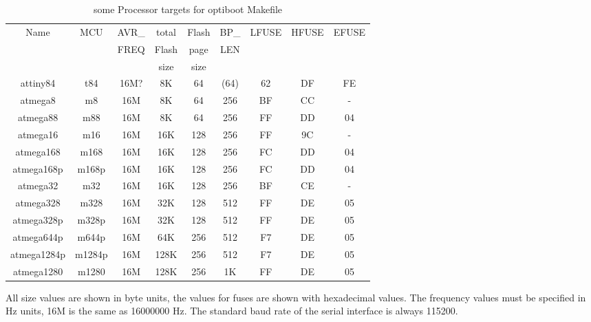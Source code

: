\begin{table}[H]
  \begin{center}
    \begin{tabular}{| c | c | c | c | c | c | c | c | c |}
    \hline
             Name  & MCU & AVR\_ & total & Flash & BP\_ & LFUSE & HFUSE & EFUSE  \\
                   &     & FREQ  & Flash & page  & LEN  &       &       &        \\
                   &     &       &  size & size  &      &       &       &        \\
    \hline
    \hline
         attiny84 & t84   & 16M? &  8K   &  64   & (64) &  62   &  DF   & FE \\
    \hline
         atmega8  & m8    & 16M  &  8K   &  64   & 256  &  BF   &  CC   &  - \\
    \hline
         atmega88 & m88   & 16M  &  8K   &  64   & 256  &  FF   &  DD   &  04 \\
    \hline
       atmega16   & m16   & 16M  &  16K  & 128   & 256  &  FF   &  9C   &  - \\
    \hline
       atmega168  &  m168  & 16M  &  16K & 128   & 256  &  FC   &  DD   &  04 \\
       atmega168p &  m168p & 16M  &  16K & 128   & 256  &  FC   &  DD   &  04 \\
    \hline
       atmega32   &  m32   & 16M  &  16K & 128   & 256  &  BF   &  CE   &  - \\
    \hline
       atmega328  &  m328  & 16M  &  32K & 128   & 512  &  FF   &  DE   &  05 \\
       atmega328p & m328p & 16M  &  32K  & 128   & 512  &  FF   &  DE   &  05 \\
    \hline
       atmega644p & m644p & 16M  &  64K  & 256   & 512  &  F7   &  DE   &  05 \\
    \hline
     atmega1284p & m1284p & 16M  & 128K  & 256   & 512  &  F7   &  DE   &  05 \\
    \hline
     atmega1280  & m1280  & 16M  &  128K & 256   & 1K   &  FF   &  DE   &  05 \\
    \hline
    \end{tabular}
  \end{center}
  \caption{some Processor targets for optiboot Makefile}
  \label{tab:processors}
\end{table}

All size values are shown in byte units, the values for fuses are shown with hexadecimal values.
The frequency values must be specified in Hz units, 16M is the same as 16000000 Hz.
The standard baud rate of the serial interface is always 115200.

